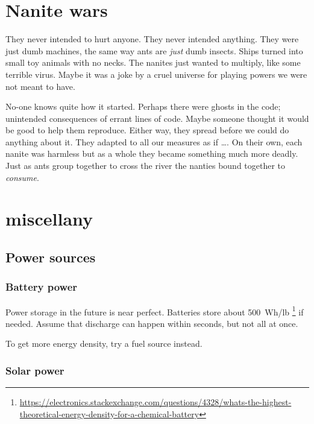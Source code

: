 \section{Nanite wars}
\label{sec:nanite-wars}

They never intended to hurt anyone. They never intended anything. They were just
dumb machines, the same way ants are \emph{just} dumb insects. Ships turned into
small toy animals with no necks. The nanites just wanted to multiply, like some
terrible virus. Maybe it was a joke by a cruel universe for playing powers we
were not meant to have.

No-one knows quite how it started. Perhaps there were ghosts in the code; unintended
consequences of errant lines of code. Maybe someone thought it would be good to help
them reproduce. Either way, they spread before we could do anything about it. They
adapted to all our measures as if \ldots{}. On their own, each nanite was harmless
but as a whole they became something much more deadly. Just as ants group together
to cross the river the nanties bound together to \emph{consume}.

\section{ miscellany}
\label{sec:system51-miscellany}

\subsection{Power sources}
\label{sec:power-sources}

\subsubsection{Battery power}
\label{sec:battery-power}

Power storage in the future is near perfect. Batteries store about 500~Wh/lb%
\footnote{\url{https://electronics.stackexchange.com/questions/4328/whats-the-highest-theoretical-energy-density-for-a-chemical-battery}}
if needed. Assume that discharge can happen within seconds, but not all at once.

To get more energy density, try a fuel source instead.

\subsubsection{Solar power}
\label{sec:solar-power}


